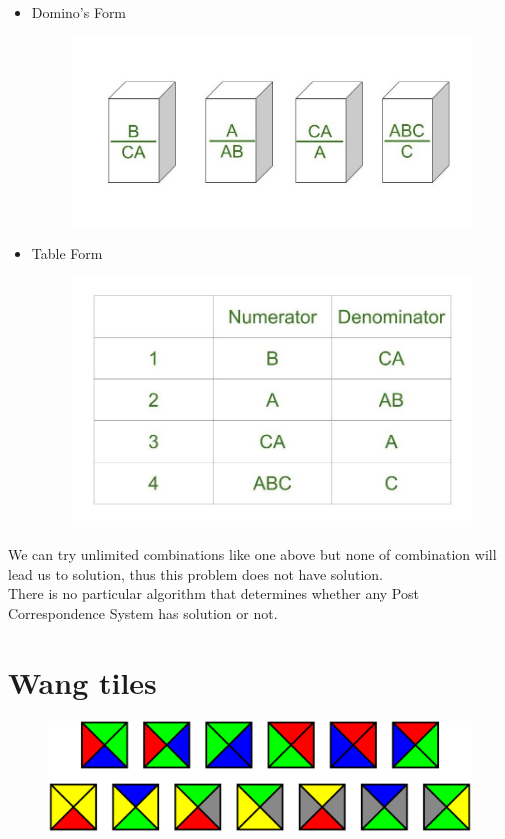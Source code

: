 \documentclass[
	12pt, %
]{fphw}
\begin{document}
\begin{itemize}
\item Domino's Form
  \begin{figure}[H]
  \centering
  \includegraphics[scale=0.4]{images/dominos.jpg}
\end{figure}
\item Table Form
  \begin{figure}[H]
  \centering
  \includegraphics[scale=0.4]{images/table.jpg}
\end{figure}
\end{itemize}

We can try unlimited combinations like one above but none of combination will lead us to solution, thus this problem does not have solution.\\
There is no particular algorithm that determines whether any Post Correspondence System has solution or not.

\section*{{\color{Cerulean}Wang tiles}}

\begin{figure}[H]
  \centering
  \includegraphics[scale=0.3]{images/wang.png}
\end{figure}
\end{document}
